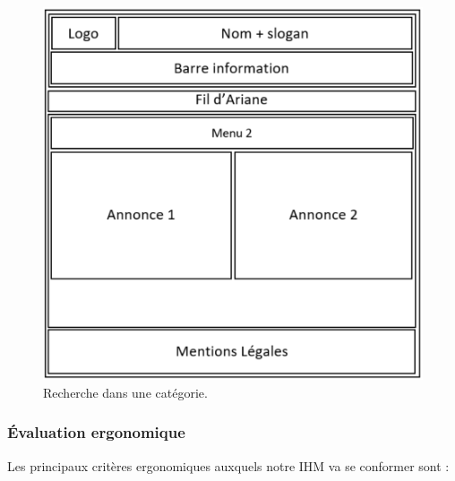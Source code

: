 \documentclass[a4paper,11pt]{article}
\begin{document}
\begin{figure}[H]
  \includegraphics[width=\linewidth]{images/maquette-recherche.png}
  \caption{Recherche dans une catégorie.}
  \label{fig:maquette-recherche}
\end{figure}

\subsubsection{Évaluation ergonomique}

Les principaux critères ergonomiques auxquels notre IHM va se conformer sont :\\
\end{document}
